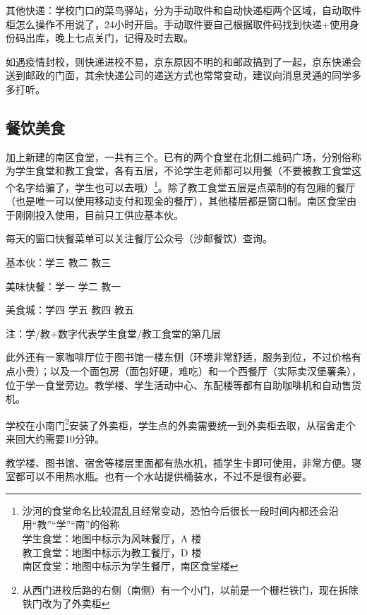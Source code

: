 其他快递：学校门口的菜鸟驿站，分为手动取件和自动快递柜两个区域，自动取件柜怎么操作不用说了，24小时开启。手动取件要自己根据取件码找到快递+使用身份码出库，晚上七点关门，记得及时去取。

如遇疫情封校，则快递进校不易，京东原因不明的和邮政搞到了一起，京东快递会送到邮政的门面，其余快递公司的递送方式也常常变动，建议向消息灵通的同学多多打听。

\subsection{餐饮美食}


加上新建的南区食堂，一共有三个。已有的两个食堂在北侧二维码广场，分别俗称为学生食堂和教工食堂，各有五层，不论学生老师都可以用餐（不要被教工食堂这个名字给骗了，学生也可以去哦）\footnote{沙河的食堂命名比较混乱且经常变动，恐怕今后很长一段时间内都还会沿用“教”“学”“南”的俗称\\\hspace*{4em}学生食堂：地图中标示为风味餐厅，A 楼\\\hspace*{4em}教工食堂：地图中标示为教工餐厅，D 楼\\\hspace*{4em}南区食堂：地图中标示为学生餐厅，南区食堂楼}。除了教工食堂五层是点菜制的有包厢的餐厅（也是唯一可以使用移动支付和现金的餐厅），其他楼层都是窗口制。南区食堂由于刚刚投入使用，目前只工供应基本伙。

每天的窗口快餐菜单可以关注餐厅公众号（沙邮餐饮）查询。

基本伙：学三 教二 教三

美味快餐：学一 学二 教一

美食城：学四 学五 教四 教五

注：学/教+数字代表学生食堂/教工食堂的第几层

此外还有一家咖啡厅位于图书馆一楼东侧（环境非常舒适，服务到位，不过价格有点小贵）；以及一个面包房（面包好硬，难吃）和一个西餐厅（实际卖汉堡薯条），位于学一食堂旁边。教学楼、学生活动中心、东配楼等都有自助咖啡机和自动售货机。


学校在小南门\footnote{从西门进校后路的右侧（南侧）有一个小门，以前是一个栅栏铁门，现在拆除铁门改为了外卖柜}安装了外卖柜，学生点的外卖需要统一到外卖柜去取，从宿舍走个来回大约需要10分钟。


教学楼、图书馆、宿舍等楼层里面都有热水机，插学生卡即可使用，非常方便。寝室都可以不用热水瓶。也有一个水站提供桶装水，不过不是很有必要。

